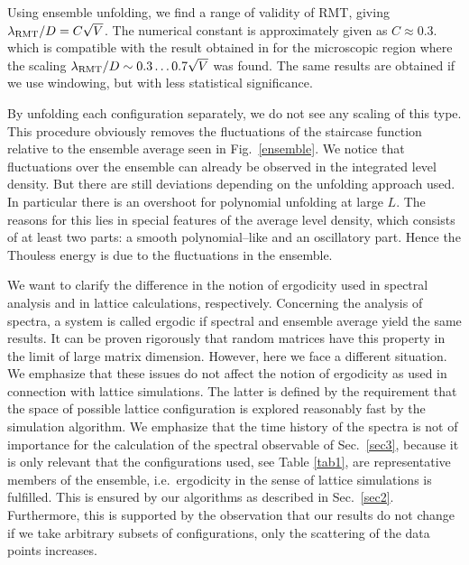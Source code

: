Using ensemble unfolding, we find a range of validity of RMT, giving
$\lambda_{\rm RMT}/D=C\sqrt{V}$.  The numerical constant is
approximately given as $C\approx0.3$.  which is compatible with the
result obtained in \cite{bitsch98} for the microscopic region where
the scaling $\lambda_{\rm RMT}/D\sim0.3\ldots0.7\sqrt{V}$ was found.
The same results are obtained if we use windowing, but with less
statistical significance.

By unfolding each configuration separately, we do not see any scaling
of this type. This procedure obviously removes the fluctuations of the
staircase function relative to the ensemble average seen in
Fig.~\ref{ensemble}. We notice that fluctuations over the ensemble can
already be observed in the integrated level density. But there are
still deviations depending on the unfolding approach used.  In
particular there is an overshoot for polynomial unfolding at large
$L$. The reasons for this lies in special features of the average
level density, which consists of at least two parts: a smooth
polynomial--like and an oscillatory part.  Hence the Thouless energy
is due to the fluctuations in the ensemble.

We want to clarify the difference in the notion of ergodicity used in
spectral analysis and in lattice calculations, respectively.
Concerning the analysis of spectra, a system is called ergodic if
spectral and ensemble average yield the same results. It can be proven
rigorously that random matrices have this property in the limit of
large matrix dimension. However, here we face a different situation.
We emphasize that these issues do not affect the notion of ergodicity
as used in connection with lattice simulations. The latter is defined
by the requirement that the space of possible lattice configuration is
explored reasonably fast by the simulation algorithm.  We emphasize
that the time history of the spectra is not of importance for the
calculation of the spectral observable of Sec.~\ref{sec3}, because it
is only relevant that the configurations used, see Table \ref{tab1}, are
representative members of the ensemble, i.e.~ergodicity in the sense
of lattice simulations is fulfilled. This is ensured by our algorithms
as described in Sec.~\ref{sec2}. Furthermore, this is supported by the
observation that our results do not change if we take arbitrary
subsets of configurations, only the scattering of the data points
increases.

